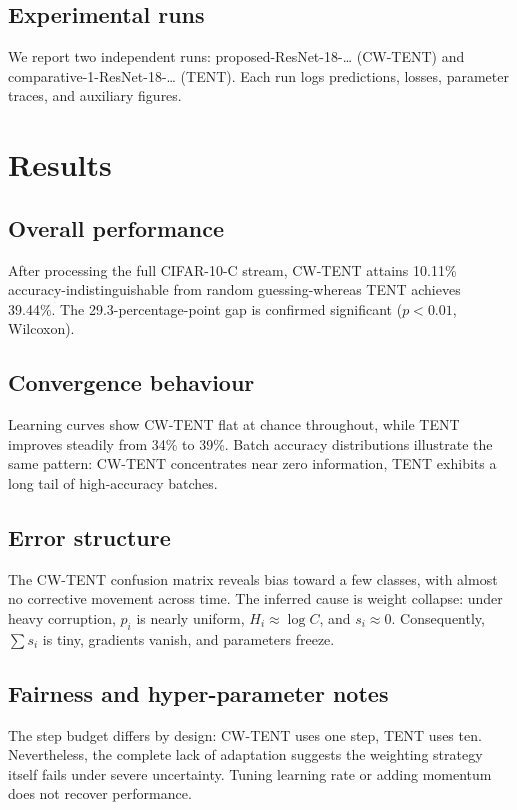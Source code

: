 \documentclass{article} %
\begin{document}
\subsection{Experimental runs}
We report two independent runs: proposed-ResNet-18-\ldots{} (CW-TENT) and comparative-1-ResNet-18-\ldots{} (TENT). Each run logs predictions, losses, parameter traces, and auxiliary figures.

\section{Results}%
\label{sec:results}%
\subsection{Overall performance}
After processing the full CIFAR-10-C stream, CW-TENT attains 10.11\% accuracy-indistinguishable from random guessing-whereas TENT achieves 39.44\%. The 29.3-percentage-point gap is confirmed significant (\(p < 0.01\), Wilcoxon).

\subsection{Convergence behaviour}
Learning curves show CW-TENT flat at chance throughout, while TENT improves steadily from 34\% to 39\%. Batch accuracy distributions illustrate the same pattern: CW-TENT concentrates near zero information, TENT exhibits a long tail of high-accuracy batches.

\subsection{Error structure}
The CW-TENT confusion matrix reveals bias toward a few classes, with almost no corrective movement across time. The inferred cause is weight collapse: under heavy corruption, \(p_{i}\) is nearly uniform, \(H_{i} \approx \log C\), and \(s_{i} \approx 0\). Consequently, \(\sum s_{i}\) is tiny, gradients vanish, and parameters freeze.

\subsection{Fairness and hyper-parameter notes}
The step budget differs by design: CW-TENT uses one step, TENT uses ten. Nevertheless, the complete lack of adaptation suggests the weighting strategy itself fails under severe uncertainty. Tuning learning rate or adding momentum does not recover performance.
\end{document}
